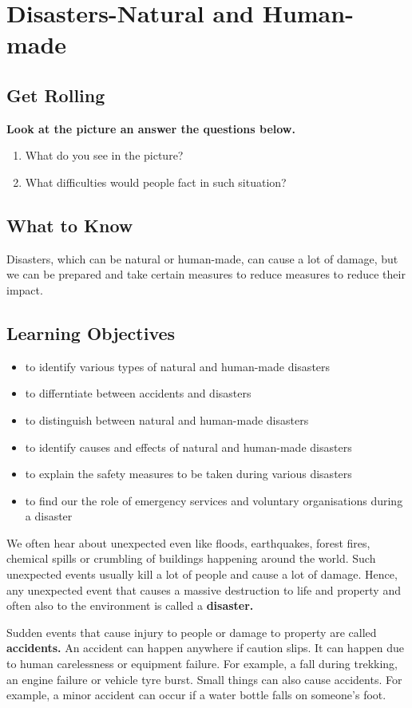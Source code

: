 \chapter{Disasters-Natural and Human-made}
\section{Get Rolling}
\textbf{Look at the picture an answer the questions below.}
\begin{enumerate}
    \item What do you see in the picture?
    \item What difficulties would people fact in such situation?
\end{enumerate}
\section{What to Know}
Disasters, which can be natural or human-made, can cause a lot of damage, but we can be prepared and take certain measures to reduce measures to reduce their impact.
\section{\textbf{Learning Objectives}}
\begin{itemize}
    \item to identify various types of natural and human-made disasters
    \item to differntiate between accidents and disasters
    \item to distinguish between natural and human-made disasters
    \item to identify causes and effects of natural and human-made disasters
    \item to explain the safety measures to be taken during various disasters
    \item to find our the role of emergency services and voluntary organisations during a disaster
\end{itemize}
We often hear about unexpected even like floods, earthquakes, forest fires, chemical spills or crumbling of buildings happening around the world. Such unexpected events usually kill a lot of people and cause a lot of damage. Hence, any unexpected event that causes a massive destruction to life and property and often also to the environment is called a \textbf{disaster.}
\vspace{0.1in}
\par
Sudden events that cause injury to people or damage to property are called \textbf{accidents.} An accident can happen anywhere if caution slips. It can happen due to human carelessness or equipment failure. For example, a fall during trekking, an engine failure or vehicle tyre burst. Small things can also cause accidents. For example, a minor accident can occur if a water bottle falls on someone's foot.
\vspace{3.0in}
